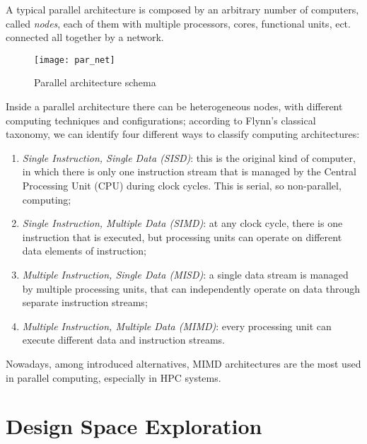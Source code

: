 A typical parallel architecture is composed by an arbitrary number of computers, called \textit{nodes}, each of them with multiple processors, cores, functional units, ect. connected all together by a network.

\begin{figure}[htb]

    \centering
    \texttt{[image: par\_net]}
    \caption{Parallel architecture schema}

\end{figure}

Inside a parallel architecture there can be heterogeneous nodes, with different computing techniques and configurations; according to Flynn's classical taxonomy, we can identify four different ways to classify computing architectures: 

\begin{enumerate}

    \item \textit{Single Instruction, Single Data (SISD)}: this is the original kind of computer, in which there is only one instruction stream that is managed by the Central Processing Unit (CPU) during clock cycles. This is serial, so non-parallel, computing;
    
    \item \textit{Single Instruction, Multiple Data (SIMD)}: at any clock cycle, there is one instruction that is executed, but processing units can operate on different data elements of instruction;
    
    \item \textit{Multiple Instruction, Single Data (MISD)}: a single data stream is managed by multiple processing units, that can independently operate on data through separate instruction streams;
    
    \item \textit{Multiple Instruction, Multiple Data (MIMD)}: every processing unit can execute different data and instruction streams.

\end{enumerate}

Nowadays, among introduced alternatives, MIMD architectures are the most used in parallel computing, especially in HPC systems.





\section{Design Space Exploration}

